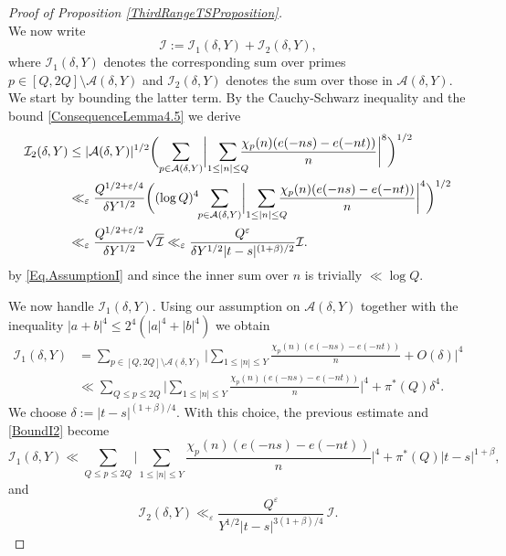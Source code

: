 \documentclass[JEP,XML,SOM,Unicode,NoFloatCountersInSection,published]{cedram}
\theoremstyle{plain}
\theoremstyle{definition}
\let\ep\varepsilon
\begin{document}
\begin{proof}[Proof of Proposition \ref{ThirdRangeTSProposition}]
\begin{equation}
\end{equation}
We now write\vspace*{-3pt}
\[
\mathcal{I}:= \mathcal{I}_1(\delta, Y)+\mathcal{I}_2 (\delta, Y),
\]
where $\mathcal{I}_1(\delta, Y)$ denotes the corresponding sum over primes $p\in [Q, 2Q]\setminus\mathcal{A}(\delta, Y)$ and $\mathcal{I}_2(\delta, Y)$ denotes the sum over those in $\mathcal{A}(\delta, Y)$. We start by bounding the latter term. By the Cauchy-Schwarz inequality and the bound \eqref{ConsequenceLemma4.5} we derive
\begin{equation}\label{BoundI2}
\begin{aligned}
\mathcal{I}_2(\delta, Y) & \leq |\mathcal{A}(\delta, Y)|^{1/2}\biggl(\sum_{p \in \mathcal{A}(\delta, Y)} \biggl|\sum_{1\leq |n|\leq Q}\hspace*{-3mm} \frac{\chi_p(n) (e(-ns)-e(-nt))}{n} \biggr|^8\biggr)^{1/2}\\
& \ll_{\ep} \frac{Q^{1/2+\ep/4}}{\delta Y^{1/2}} \biggl((\log Q)^4\hspace*{-1mm}\sum_{p \in \mathcal{A}(\delta,Y)} \biggl|\sum_{1\leq |n|\leq Q}\hspace*{-3mm} \frac{\chi_p(n) (e(-ns)-e(-nt))}{n} \biggr|^4\biggr)^{1/2}\\
& \ll_{\ep} \frac{Q^{1/2+\ep/2}}{\delta Y^{1/2}} \sqrt{\mathcal{I}}\ll_{\ep} \frac{Q^{\ep}}{\delta Y^{1/2} |t-s|^{(1+\beta)/2}} \mathcal{I}.
\end{aligned}
\end{equation}
by \eqref{Eq.AssumptionI} and since the inner sum over $n$ is trivially $\ll \log Q$.

We now handle $\mathcal{I}_1(\delta, Y)$. Using our assumption on $\mathcal{A}(\delta,Y)$ together with the inequality $|a+b|^{4} \leq 2^{4}(|a|^{4}+|b|^{4})$ we obtain
\begin{align*}
\mathcal{I}_1(\delta, Y)&= \sum_{p\in [Q, 2Q]\setminus\mathcal{A}(\delta,Y)} \biggl|\sum_{1\leq |n|\leq Y} \frac{\chi_p(n) (e(-ns)-e(-nt))}{n} +O(\delta) \biggr|^4\\
& \ll \sum_{Q\leq p\leq 2Q} \biggl|\sum_{1\leq |n|\leq Y} \frac{\chi_p(n) (e(-ns)-e(-nt))}{n} \biggr|^4 + \pi^{*}(Q)\delta^4.
\end{align*}
We choose $\delta:= |t-s|^{(1+\beta)/4}$. With this choice, the previous estimate and \eqref{BoundI2} become
\begin{equation}\label{Eq.SecondBoundI1}
\mathcal{I}_1(\delta, Y) \ll \sum_{Q\leq p\leq 2Q} \biggl|\sum_{1\leq |n|\leq Y} \frac{\chi_p(n) (e(-ns)-e(-nt))}{n} \biggr|^4 + \pi^{*}(Q)|t-s|^{1+\beta},
\end{equation}
and
\begin{equation}\label{Eq.SecondBoundI2}
\mathcal{I}_2(\delta, Y) \ll_{\ep} \frac{Q^{\ep}}{Y^{1/2} |t-s|^{3(1+\beta)/4}}\, \mathcal{I}.
\end{equation}


\end{proof}
\end{document}
